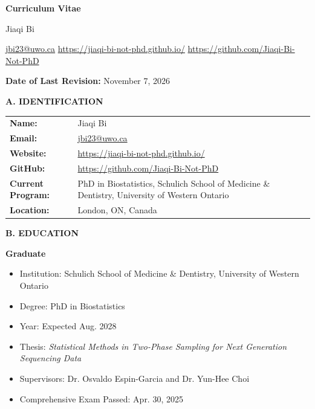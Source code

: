 \documentclass[10pt]{article}
\newcommand{\cvsection}[1]{%
  \Needspace{5\baselineskip}%
  \vspace{0.65em}%
  {\large\bfseries\color{sectiongray} #1}\par
  \vspace{0.18em}%
}
\newcommand{\cvsubsection}[1]{%
  \Needspace{4\baselineskip}%
  \vspace{0.3em}%
  {\bfseries #1}\par
}
\begin{document}
\small

\begin{center}
  {\LARGE\bfseries Curriculum Vitae\par}
  \vspace{0.25em}
  {\large Jiaqi Bi\par}
  \vspace{0.4em}
  \href{mailto:jbi23@uwo.ca}{jbi23@uwo.ca}
  \quad\textbar\quad
  \url{https://jiaqi-bi-not-phd.github.io/}
  \quad\textbar\quad
  \url{https://github.com/Jiaqi-Bi-Not-PhD}\par
  \vspace{0.45em}
  {\bfseries Date of Last Revision:} November 7, 2026
\end{center}

\cvsection{A. IDENTIFICATION}

\begin{tabularx}{\linewidth}{@{}>{\bfseries}p{1.35in}X@{}}
Name: & Jiaqi Bi \\
Email: & \href{mailto:jbi23@uwo.ca}{jbi23@uwo.ca} \\
Website: & \url{https://jiaqi-bi-not-phd.github.io/} \\
GitHub: & \url{https://github.com/Jiaqi-Bi-Not-PhD} \\
Current Program: & PhD in Biostatistics, Schulich School of Medicine \& Dentistry, University of Western Ontario \\
Location: & London, ON, Canada \\
\end{tabularx}

\cvsection{B. EDUCATION}

\cvsubsection{Graduate}
\begin{itemize}[leftmargin=1.6em,label=--]
\item Institution: Schulich School of Medicine \& Dentistry, University of Western Ontario
\item Degree: PhD in Biostatistics
\item Year: Expected Aug. 2028
\item Thesis: \emph{Statistical Methods in Two-Phase Sampling for Next Generation Sequencing Data}
\item Supervisors: Dr. Osvaldo Espin-Garcia and Dr. Yun-Hee Choi
\item Comprehensive Exam Passed: Apr. 30, 2025
\end{itemize}
\end{document}

